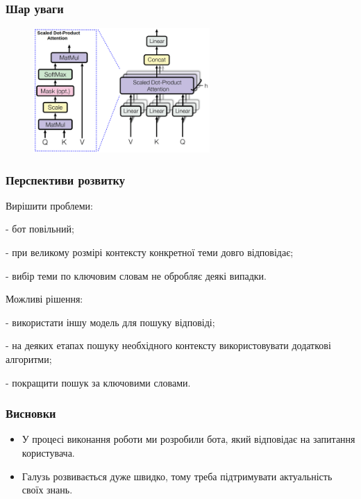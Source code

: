 \documentclass{beamer}
\begin{document}
\begin{frame}
    \frametitle{Шар уваги}
    \begin{figure}[H]
        \centering
        \includegraphics[width=0.6\textwidth]{attention_layer.png}
    \end{figure}
\end{frame}

\begin{frame}
    \frametitle{Перспективи розвитку}
    Вирішити проблеми:

    - бот повільний;

    - при великому розмірі контексту конкретної теми довго відповідає;

    - вибір теми по ключовим словам не обробляє деякі випадки.

    Можливі рішення:
    
    - використати іншу модель для пошуку відповіді;

    - на деяких етапах пошуку необхідного контексту використовувати додаткові алгоритми;

    - покращити пошук за ключовими словами.
\end{frame}

\begin{frame}
    \frametitle{Висновки}

    \begin{itemize}
        \item У процесі виконання роботи ми розробили бота, який відповідає на запитання користувача.
        \item Галузь розвивається дуже швидко, тому треба підтримувати актуальність своїх знань.
    \end{itemize}
    
\end{frame}
\end{document}
